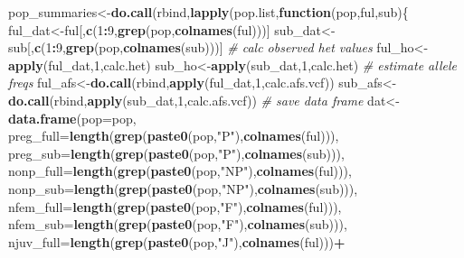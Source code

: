 \documentclass[]{article}
\newenvironment{Shaded}{\begin{snugshade}}{\end{snugshade}}
\newcommand{\KeywordTok}[1]{\textcolor[rgb]{0.13,0.29,0.53}{\textbf{#1}}}
\newcommand{\DataTypeTok}[1]{\textcolor[rgb]{0.13,0.29,0.53}{#1}}
\newcommand{\DecValTok}[1]{\textcolor[rgb]{0.00,0.00,0.81}{#1}}
\newcommand{\StringTok}[1]{\textcolor[rgb]{0.31,0.60,0.02}{#1}}
\newcommand{\CommentTok}[1]{\textcolor[rgb]{0.56,0.35,0.01}{\textit{#1}}}
\newcommand{\ControlFlowTok}[1]{\textcolor[rgb]{0.13,0.29,0.53}{\textbf{#1}}}
\newcommand{\OperatorTok}[1]{\textcolor[rgb]{0.81,0.36,0.00}{\textbf{#1}}}
\newcommand{\NormalTok}[1]{#1}
\begin{document}
\begin{Shaded}
\begin{Highlighting}[]
\NormalTok{pop_summaries<-}\KeywordTok{do.call}\NormalTok{(rbind,}\KeywordTok{lapply}\NormalTok{(pop.list,}\ControlFlowTok{function}\NormalTok{(pop,ful,sub)\{}
\NormalTok{  ful_dat<-ful[,}\KeywordTok{c}\NormalTok{(}\DecValTok{1}\OperatorTok{:}\DecValTok{9}\NormalTok{,}\KeywordTok{grep}\NormalTok{(pop,}\KeywordTok{colnames}\NormalTok{(ful)))]}
\NormalTok{  sub_dat<-sub[,}\KeywordTok{c}\NormalTok{(}\DecValTok{1}\OperatorTok{:}\DecValTok{9}\NormalTok{,}\KeywordTok{grep}\NormalTok{(pop,}\KeywordTok{colnames}\NormalTok{(sub)))]}
  \CommentTok{# calc observed het values}
\NormalTok{  ful_ho<-}\KeywordTok{apply}\NormalTok{(ful_dat,}\DecValTok{1}\NormalTok{,calc.het)}
\NormalTok{  sub_ho<-}\KeywordTok{apply}\NormalTok{(sub_dat,}\DecValTok{1}\NormalTok{,calc.het)}
  \CommentTok{# estimate allele freqs}
\NormalTok{  ful_afs<-}\KeywordTok{do.call}\NormalTok{(rbind,}\KeywordTok{apply}\NormalTok{(ful_dat,}\DecValTok{1}\NormalTok{,calc.afs.vcf))}
\NormalTok{  sub_afs<-}\KeywordTok{do.call}\NormalTok{(rbind,}\KeywordTok{apply}\NormalTok{(sub_dat,}\DecValTok{1}\NormalTok{,calc.afs.vcf))}
  \CommentTok{# save data frame}
\NormalTok{  dat<-}\KeywordTok{data.frame}\NormalTok{(}\DataTypeTok{pop=}\NormalTok{pop,}
                  \DataTypeTok{preg_full=}\KeywordTok{length}\NormalTok{(}\KeywordTok{grep}\NormalTok{(}\KeywordTok{paste0}\NormalTok{(pop,}\StringTok{"P"}\NormalTok{),}\KeywordTok{colnames}\NormalTok{(ful))),}
                  \DataTypeTok{preg_sub=}\KeywordTok{length}\NormalTok{(}\KeywordTok{grep}\NormalTok{(}\KeywordTok{paste0}\NormalTok{(pop,}\StringTok{"P"}\NormalTok{),}\KeywordTok{colnames}\NormalTok{(sub))),}
                  \DataTypeTok{nonp_full=}\KeywordTok{length}\NormalTok{(}\KeywordTok{grep}\NormalTok{(}\KeywordTok{paste0}\NormalTok{(pop,}\StringTok{"NP"}\NormalTok{),}\KeywordTok{colnames}\NormalTok{(ful))),}
                  \DataTypeTok{nonp_sub=}\KeywordTok{length}\NormalTok{(}\KeywordTok{grep}\NormalTok{(}\KeywordTok{paste0}\NormalTok{(pop,}\StringTok{"NP"}\NormalTok{),}\KeywordTok{colnames}\NormalTok{(sub))),}
                  \DataTypeTok{nfem_full=}\KeywordTok{length}\NormalTok{(}\KeywordTok{grep}\NormalTok{(}\KeywordTok{paste0}\NormalTok{(pop,}\StringTok{"F"}\NormalTok{),}\KeywordTok{colnames}\NormalTok{(ful))),}
                  \DataTypeTok{nfem_sub=}\KeywordTok{length}\NormalTok{(}\KeywordTok{grep}\NormalTok{(}\KeywordTok{paste0}\NormalTok{(pop,}\StringTok{"F"}\NormalTok{),}\KeywordTok{colnames}\NormalTok{(sub))),}
                  \DataTypeTok{njuv_full=}\KeywordTok{length}\NormalTok{(}\KeywordTok{grep}\NormalTok{(}\KeywordTok{paste0}\NormalTok{(pop,}\StringTok{"J"}\NormalTok{),}\KeywordTok{colnames}\NormalTok{(ful)))}\OperatorTok{+}

\end{Highlighting}
\end{Shaded}
\end{document}
